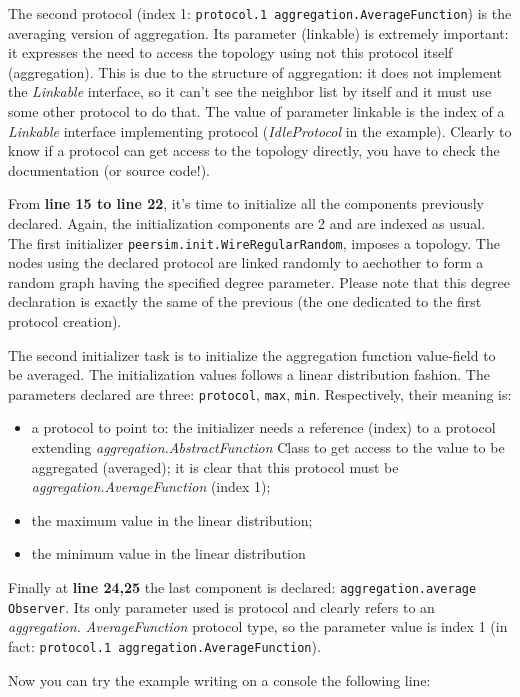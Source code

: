 \documentclass[a4paper,12pt]{article}
\begin{document}
The second protocol (index 1: \texttt{protocol.1 aggregation.AverageFunction})
is the averaging version of aggregation. Its parameter (linkable)
is extremely important: it expresses the need to access the topology
using not this protocol itself (aggregation). This is due to the structure
of aggregation: it does not implement the \emph{Linkable} interface,
so it can't see the neighbor list by itself and it must use some other
protocol to do that. The value of parameter linkable is the index
of a \emph{Linkable} interface implementing protocol (\emph{IdleProtocol}
in the example). Clearly to know if a protocol can get access to the
topology directly, you have to check the documentation (or source
code!).

From \textbf{line 15 to line 22}, it's time to initialize all the
components previously declared. Again, the initialization components
are 2 and are indexed as usual. The first initializer 
\texttt{peersim.init.WireRegularRandom},
imposes a topology. The nodes using the declared protocol are linked
randomly to aechother to form a random graph having the specified
degree parameter. Please note that this degree declaration is exactly
the same of the previous (the one dedicated to the first protocol
creation). 

The second initializer task is to initialize the aggregation function
value-field to be averaged. The initialization values follows a linear
distribution fashion. The parameters declared are three: \texttt{protocol},
\texttt{max}, \texttt{min}. Respectively, their meaning is:

\begin{itemize}
\item a protocol to point to: the initializer needs a reference (index)
to a protocol extending \emph{aggregation.AbstractFunction} Class
to get access to the value to be aggregated (averaged); it is clear
that this protocol must be \emph{aggregation.AverageFunction} (index
1);
\item the maximum value in the linear distribution; 
\item the minimum value in the linear distribution 
\end{itemize}
Finally at \textbf{line 24,25} the last component is declared: 
\texttt{aggregation.average Observer}.
Its only parameter used is protocol and clearly refers to an \emph{aggregation.
AverageFunction} protocol type, so the parameter value is index 1
(in fact: \texttt{protocol.1 aggregation.AverageFunction}). 

Now you can try the example writing on a console the following line:\\
\end{document}
